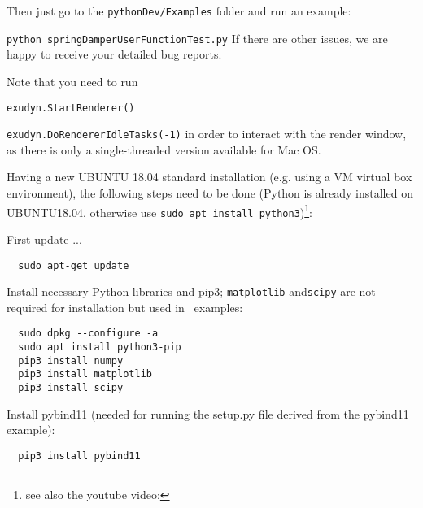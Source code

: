 \ei
Then just go to the \texttt{pythonDev/Examples} folder and run an example:
\bi
  \item[] \texttt{python springDamperUserFunctionTest.py}
\ei
If there are other issues, we are happy to receive your detailed bug reports. 

\noindent Note that you need to run 
\bi
\item[] \texttt{exudyn.StartRenderer()}
\item[] \texttt{exudyn.DoRendererIdleTasks(-1)}
\ei
in order to interact with the render window, as there is only a single-threaded version available for Mac OS.

\label{sec:build:ubuntu}
Having a new UBUNTU 18.04 standard installation (e.g. using a VM virtual box environment), the following steps need to be done (Python  is already installed on UBUNTU18.04, otherwise use \texttt{sudo apt install python3})\footnote{see also the youtube video: }:

\noindent First update ...
\plainlststyle
\begin{lstlisting}
  sudo apt-get update
\end{lstlisting}

\noindent 
Install necessary Python libraries and pip3; \texttt{matplotlib} and\texttt{scipy} are not required for installation but used in \codeName\ examples:
\begin{lstlisting}
  sudo dpkg --configure -a
  sudo apt install python3-pip
  pip3 install numpy
  pip3 install matplotlib
  pip3 install scipy
\end{lstlisting}

\noindent Install pybind11 (needed for running the setup.py file derived from the pybind11 example):
\begin{lstlisting}
  pip3 install pybind11
\end{lstlisting}

